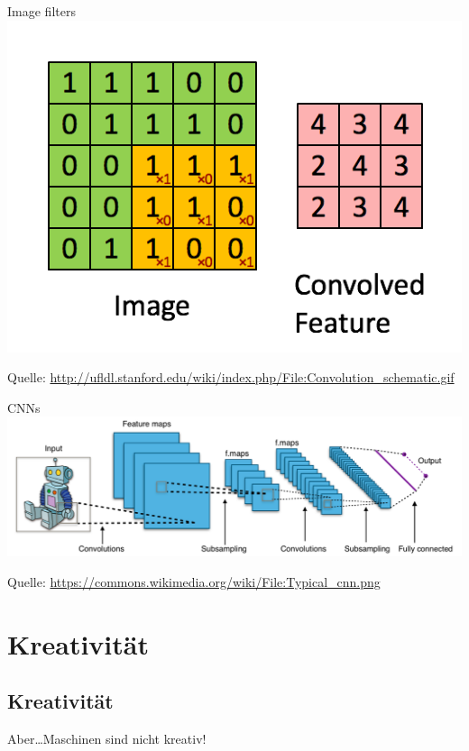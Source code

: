 \begin{frame}{Image filters}
    \includegraphics[width=\textwidth, height=0.8\textheight, keepaspectratio]{../presentation-images/image-filter-8.png}

    Quelle: \href{http://ufldl.stanford.edu/wiki/index.php/File:Convolution_schematic.gif}{http://ufldl.stanford.edu/wiki/index.php/File:Convolution\_schematic.gif}
\end{frame}


\begin{frame}{CNNs}
    \includegraphics[width=\textwidth, height=0.8\textheight, keepaspectratio]{../presentation-images/Typical-cnn.png}

    Quelle: \href{https://commons.wikimedia.org/wiki/File:Typical_cnn.png}{https://commons.wikimedia.org/wiki/File:Typical\_cnn.png}
\end{frame}

\section{Kreativität}
\subsection{Kreativität}
\begin{frame}{}
    \begin{center}
        \Huge Aber\dots Maschinen sind nicht kreativ!
    \end{center}
\end{frame}


